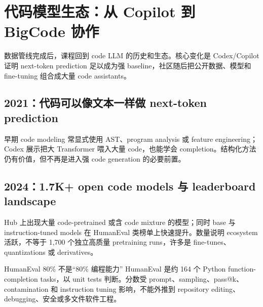 \section{代码模型生态：从 Copilot 到 BigCode 协作}

数据管线完成后，课程回到 code LLM 的历史和生态。核心变化是 Codex/Copilot 证明 next-token prediction 足以成为强 baseline，社区随后把公开数据、模型和 fine-tuning 组合成大量 code assistants。

\subsection{2021：代码可以像文本一样做 next-token prediction}

早期 code modeling 常显式使用 AST、program analysis 或 feature engineering；Codex 展示把大 Transformer 喂入大量 code，也能学会 completion。结构化方法仍有价值，但不再是进入强 code generation 的必要前置。



\subsection{2024：1.7K+ open code models 与 leaderboard landscape}

Hub 上出现大量 code-pretrained 或含 code mixture 的模型；同时 base 与 instruction-tuned models 在 HumanEval 类榜单上快速提升。数量说明 ecosystem 活跃，不等于 1,700 个独立高质量 pretraining runs，许多是 fine-tunes、quantizations 或 derivatives。



\begin{warningbox}{HumanEval 80\% 不是“80\% 编程能力”}
HumanEval 是约 164 个 Python function-completion tasks，以 unit tests 判断。分数受 prompt、sampling、pass@k、contamination 和 instruction tuning 影响，不能外推到 repository editing、debugging、安全或多文件软件工程。
\end{warningbox}

